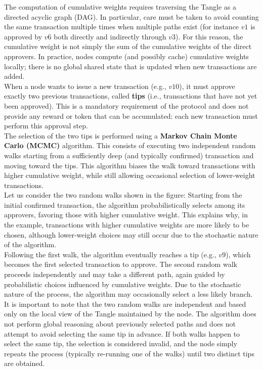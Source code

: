 \documentclass{scrbook}
\begin{document}
The computation of cumulative weights requires traversing the Tangle as a directed acyclic graph (DAG). In particular, care must be taken to avoid counting the same transaction multiple times when multiple paths exist (for instance $v1$ is approved by $v6$ both directly and indirectly through $v3$). For this reason, the cumulative weight is not simply the sum of the cumulative weights of the direct approvers. In practice, nodes compute (and possibly cache) cumulative weights locally; there is no global shared state that is updated when new transactions are added.\\

When a node wants to issue a new transaction (e.g., $v10$), it must approve exactly two previous transactions, called \textbf{tips} (i.e., transactions that have not yet been approved). This is a mandatory requirement of the protocol and does not provide any reward or token that can be accumulated: each new transaction must perform this approval step.\\

The selection of the two tips is performed using a \textbf{Markov Chain Monte Carlo (MCMC)} algorithm. This consists of executing two independent random walks starting from a sufficiently deep (and typically confirmed) transaction and moving toward the tips. This algorithm biases the walk toward transactions with higher cumulative weight, while still allowing occasional selection of lower-weight transactions.\\

Let us consider the two random walks shown in the figure: Starting from the initial confirmed transaction, the algorithm probabilistically selects among its approvers, favoring those with higher cumulative weight. This explains why, in the example, transactions with higher cumulative weights are more likely to be chosen, although lower-weight choices may still occur due to the stochastic nature of the algorithm.\\

Following the first walk, the algorithm eventually reaches a tip (e.g., $v9$), which becomes the first selected transaction to approve. The second random walk proceeds independently and may take a different path, again guided by probabilistic choices influenced by cumulative weights. Due to the stochastic nature of the process, the algorithm may occasionally select a less likely branch.\\

It is important to note that the two random walks are independent and based only on the local view of the Tangle maintained by the node. The algorithm does not perform global reasoning about previously selected paths and does not attempt to avoid selecting the same tip in advance. If both walks happen to select the same tip, the selection is considered invalid, and the node simply repeats the process (typically re-running one of the walks) until two distinct tips are obtained.\\
\end{document}
